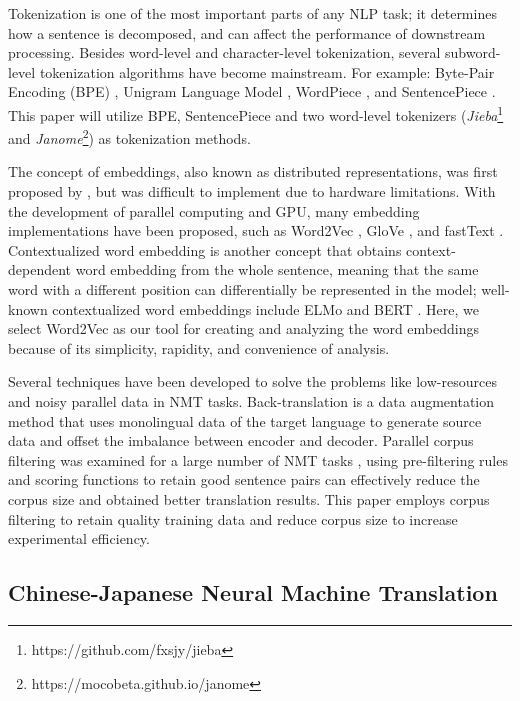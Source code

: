 Tokenization is one of the most important parts of any NLP task; it determines how a sentence is decomposed, and can affect the performance of downstream processing. Besides word-level and character-level tokenization, several subword-level tokenization algorithms have become mainstream. For example: Byte-Pair Encoding (BPE) \cite{sennrich_neural_2016}, Unigram Language Model \cite{kudo-2018-subword}, WordPiece \cite{6289079}, and SentencePiece \cite{kudo-richardson-2018-sentencepiece}. This paper will utilize BPE, SentencePiece \cite{sennrich_neural_2016, kudo-richardson-2018-sentencepiece} and two word-level tokenizers (\textit{Jieba}\footnote{https://github.com/fxsjy/jieba} and \textit{Janome}\footnote{https://mocobeta.github.io/janome}) as tokenization methods.

The concept of embeddings, also known as distributed representations, was first proposed by \cite{hinton1986learning, bengio2003neural}, but was difficult to implement due to hardware limitations. With the development of parallel computing and GPU, many embedding implementations have been proposed, such as Word2Vec \cite{mikolov2013efficient}, GloVe \cite{pennington2014glove}, and fastText \cite{bojanowski2017enriching}. Contextualized word embedding is another concept that obtains context-dependent word embedding from the whole sentence, meaning that the same word with a different position can differentially be represented in the model; well-known contextualized word embeddings include ELMo \cite{peters-etal-2018-deep} and BERT \cite{devlin-etal-2019-bert}. Here, we select Word2Vec \cite{mikolov2013efficient} as our tool for creating and analyzing the word embeddings because of its simplicity, rapidity, and convenience of analysis.

Several techniques have been developed to solve the problems like low-resources and noisy parallel data in NMT tasks. Back-translation \cite{sennrich-etal-2016-improving} is a data augmentation method that uses monolingual data of the target language to generate source data and offset the imbalance between encoder and decoder. Parallel corpus filtering was examined for a large number of NMT tasks \cite{koehn2018findings}, using pre-filtering rules and scoring functions to retain good sentence pairs can effectively reduce the corpus size and obtained better translation results. This paper employs corpus filtering to retain quality training data and reduce corpus size to increase experimental efficiency.

\subsection{Chinese-Japanese Neural Machine Translation}

